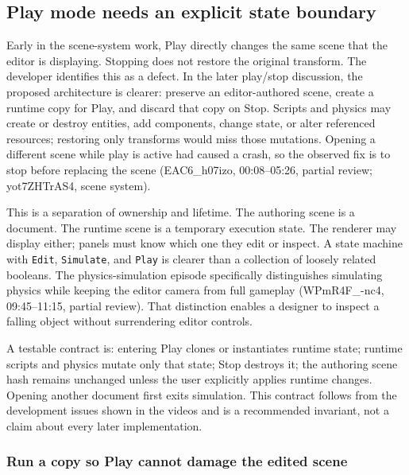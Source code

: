 \subsection{Play mode needs an explicit state boundary}\label{06-engine-ii-ch033-play-mode-needs-an-explicit-state-boundary}

\hypertarget{06-engine-ii-ch033-play-mode-needs-an-explicit-state-boundary}{}

Early in the scene-system work, Play directly changes the same scene that the editor is displaying. Stopping does not restore the original transform. The developer identifies this as a defect. In the later play/stop discussion, the proposed architecture is clearer: preserve an editor-authored scene, create a runtime copy for Play, and discard that copy on Stop. Scripts and physics may create or destroy entities, add components, change state, or alter referenced resources; restoring only transforms would miss those mutations. Opening a different scene while play is active had caused a crash, so the observed fix is to stop before replacing the scene (EAC6\_h07izo, 00:08--05:26, partial review; yot7ZHTrAS4, scene system).

This is a separation of ownership and lifetime. The authoring scene is a document. The runtime scene is a temporary execution state. The renderer may display either; panels must know which one they edit or inspect. A state machine with \texttt{Edit}, \texttt{Simulate}, and \texttt{Play} is clearer than a collection of loosely related booleans. The physics-simulation episode specifically distinguishes simulating physics while keeping the editor camera from full gameplay (WPmR4F\_-nc4, 09:45--11:15, partial review). That distinction enables a designer to inspect a falling object without surrendering editor controls.

A testable contract is: entering Play clones or instantiates runtime state; runtime scripts and physics mutate only that state; Stop destroys it; the authoring scene hash remains unchanged unless the user explicitly applies runtime changes. Opening another document first exits simulation. This contract follows from the development issues shown in the videos and is a recommended invariant, not a claim about every later implementation.

\subsubsection{Run a copy so Play cannot damage the edited scene}\label{06-engine-ii-ch033-run-a-copy-so-play-cannot-damage-the-edited-scene}


